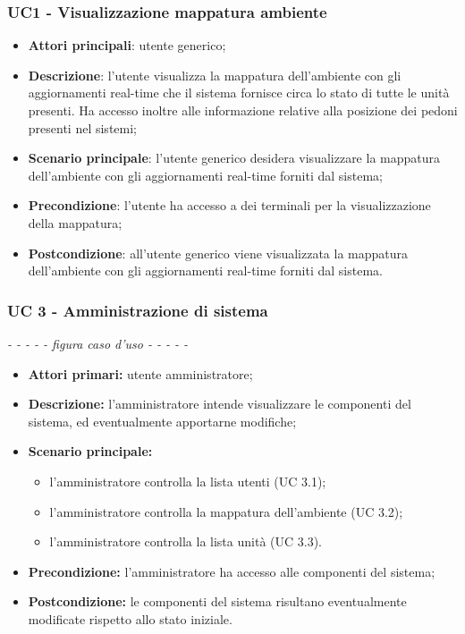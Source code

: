 \subsubsection{UC1 - Visualizzazione mappatura ambiente}
\begin{itemize}
		\item \textbf{Attori principali}: utente generico;
		\item \textbf{Descrizione}: l'utente visualizza la mappatura dell'ambiente con gli aggiornamenti real-time che il sistema fornisce circa lo stato di tutte le unità presenti. Ha accesso inoltre alle informazione relative alla posizione dei pedoni presenti nel sistemi;
		\item \textbf{Scenario principale}: l'utente generico desidera visualizzare la mappatura dell'ambiente con gli aggiornamenti real-time forniti dal sistema; 
		\item \textbf{Precondizione}: l'utente ha accesso a dei terminali per la visualizzazione della mappatura;
		\item \textbf{Postcondizione}: all'utente generico viene visualizzata la mappatura dell'ambiente con gli aggiornamenti real-time forniti dal sistema. 
\end{itemize}

\subsubsection{UC 3 - Amministrazione di sistema}
	\textit{- - - - - figura caso d'uso - - - - -}
	\begin{itemize}
		\item \textbf{Attori primari:} utente amministratore;
		\item \textbf{Descrizione:} l'amministratore intende visualizzare le componenti del sistema, ed eventualmente apportarne modifiche;
		\item \textbf{Scenario principale:} 
			\begin{itemize}
				\item l'amministratore controlla la lista utenti (UC 3.1);
				\item l'amministratore controlla la mappatura dell'ambiente (UC 3.2);
				\item l'amministratore controlla la lista unità (UC 3.3).
			\end{itemize}
		\item \textbf{Precondizione:} l'amministratore ha accesso alle componenti del sistema;
		\item \textbf{Postcondizione:} le componenti del sistema risultano eventualmente modificate rispetto allo stato iniziale.
	\end{itemize}
	
